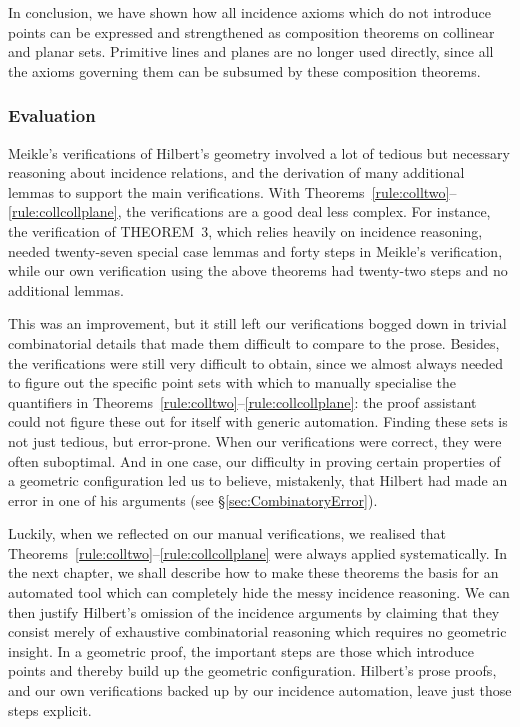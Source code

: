 In conclusion, we have shown how all incidence axioms which do not introduce points can be expressed and strengthened as composition theorems on collinear and planar sets. Primitive lines and planes are no longer used directly, since all the axioms governing them can be subsumed by these composition theorems.

\subsubsection{Evaluation}
Meikle's verifications of Hilbert's geometry involved a lot of tedious but necessary reasoning about incidence relations, and the derivation of many additional lemmas to support the main verifications. With Theorems~\ref{rule:colltwo}--\ref{rule:collcollplane}, the verifications are a good deal less complex. For instance, the verification of THEOREM~3, which relies heavily on incidence reasoning, needed twenty-seven special case lemmas and forty steps in Meikle's verification, while our own verification using the above theorems had twenty-two steps and no additional lemmas. 

This was an improvement, but it still left our verifications bogged down in trivial combinatorial details that made them difficult to compare to the prose. Besides, the verifications were still very difficult to obtain, since we almost always needed to figure out the specific point sets with which to manually specialise the quantifiers in Theorems~\ref{rule:colltwo}--\ref{rule:collcollplane}: the proof assistant could not figure these out for itself with generic automation. Finding these sets is not just tedious, but error-prone. When our verifications were correct, they were often suboptimal. And in one case, our difficulty in proving certain properties of a geometric configuration led us to believe, mistakenly, that Hilbert had made an error in one of his arguments (see \S\ref{sec:CombinatoryError}).

Luckily, when we reflected on our manual verifications, we realised that Theorems~\ref{rule:colltwo}--\ref{rule:collcollplane} were always applied systematically. In the next chapter, we shall describe how to make these theorems the basis for an automated tool which can completely hide the messy incidence reasoning. We can then justify Hilbert's omission of the incidence arguments by claiming that they consist merely of exhaustive combinatorial reasoning which requires no geometric insight. In a geometric proof, the important steps are those which introduce points and thereby build up the geometric configuration. Hilbert's prose proofs, and our own verifications backed up by our incidence automation, leave just those steps explicit.

